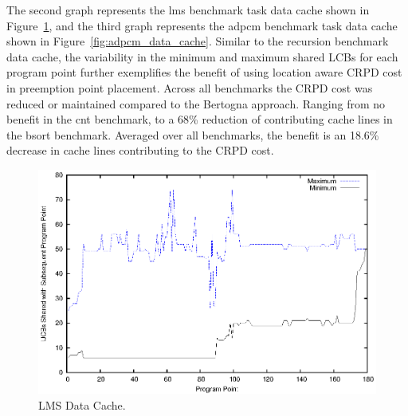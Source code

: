 The second graph represents the lms benchmark task data cache shown in
Figure~\ref{fig:lms_data_cache}, and the third graph represents the
adpcm benchmark task data cache shown in
Figure~\ref{fig:adpcm_data_cache}. Similar to the recursion benchmark
data cache, the variability in the minimum and maximum shared LCBs for
each program point further exemplifies the benefit of using location
aware CRPD cost in preemption point placement. Across all 
benchmarks the CRPD cost was reduced or maintained compared to the
Bertogna approach. Ranging from no benefit in the cnt benchmark, to a 68\%
reduction of contributing cache lines in the bsort benchmark. Averaged
over all benchmarks, the benefit is an 18.6\% decrease in cache lines
contributing to the CRPD cost.

\begin{figure}[h!]
\vspace{-10pt}
\begin{center}
\includegraphics[width=\linewidth]{eps/lms-dcache.eps}
\caption{LMS Data Cache.}
\label{fig:lms_data_cache}
\end{center}
\vspace{-10pt}
\end{figure}
